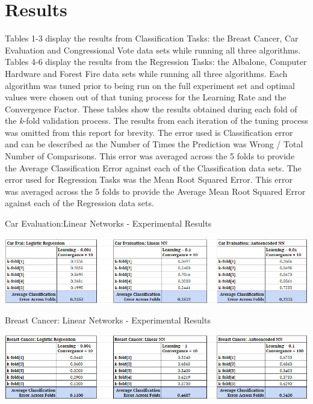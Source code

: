 \documentclass[twoside,11pt]{article}
\begin{document}
\section{Results}
Tables 1-3 display the results from Classification Tasks: the Breast Cancer, Car Evaluation and Congressional Vote data sets while running all three algorithms. Tables 4-6 display the results from the Regression Tasks: the Albalone, Computer Hardware and Forest Fire data sets while running all three algorithms. Each algorithm was tuned prior to being run on the full experiment set and optimal values were chosen out of that tuning process for the Learning Rate and the Convergence Factor. These tables show the results obtained during each fold of the \textit{k}-fold validation process. The results from each iteration of the tuning process was omitted from this report for brevity. The error used is Classification error and can be described as the Number of Times the Prediction was Wrong / Total Number of Comparisons. This error was averaged across the 5 folds to provide the Average Classification Error against each of the Classification data sets. The error used for Regression Tasks was the Mean Root Squared Error. This error was averaged across the 5 folds to provide the Average Mean Root Squared Error against each of the Regression data sets.\newline

\begin{table}[h]
		\centering
		\caption{Car Evaluation:Linear Networks - Experimental Results}
		\label{tab:table1}
		\includegraphics[scale=.7]{CarEval_All_Results}\newline
\end{table}

\begin{table}[h]
		\centering
		\caption{Breast Cancer: Linear Networks - Experimental Results}
		\label{tab:table2}
		\includegraphics[scale=.7]{BC_All_Results}\newline
\end{table}
\end{document}

